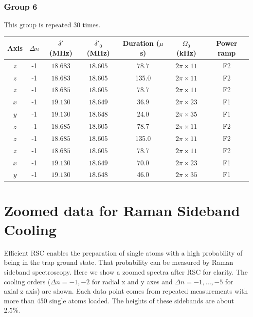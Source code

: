 \documentclass[aps,secnumarabic,amsmath,amssymb]{revtex4}
\begin{document}
\subsubsection{Group 6}
This group is repeated 30 times.
\begin{center}
  \begin{tabular}{|c|c|c|c|c|c|c|}
    \hline
    Axis&$\Delta n$&$\delta'$ (MHz)&$\delta'_0$ (MHz)&Duration ($\mu$s)& $\Omega_0$ (kHz)&Power ramp\\\hline
    $z$&-1&$18.683$&$18.605$&78.7&$2\pi\times11$&F2\\\hline
    $z$&-1&$18.683$&$18.605$&135.0&$2\pi\times11$&F2\\\hline
    $z$&-1&$18.685$&$18.605$&78.7&$2\pi\times11$&F2\\\hline
    $x$&-1&$19.130$&$18.649$&36.9&$2\pi\times23$&F1\\\hline
    $y$&-1&$19.130$&$18.648$&24.0&$2\pi\times35$&F1\\\hline
    $z$&-1&$18.685$&$18.605$&78.7&$2\pi\times11$&F2\\\hline
    $z$&-1&$18.685$&$18.605$&135.0&$2\pi\times11$&F2\\\hline
    $z$&-1&$18.685$&$18.605$&78.7&$2\pi\times11$&F2\\\hline
    $x$&-1&$19.130$&$18.649$&70.0&$2\pi\times23$&F1\\\hline
    $y$&-1&$19.130$&$18.648$&46.0&$2\pi\times35$&F1\\\hline
  \end{tabular}
\end{center}
\newpage

\section{Zoomed data for Raman Sideband Cooling}
Efficient RSC enables the preparation of single atoms with a high probability of being in the trap ground state.  That probability can be measured by Raman sideband spectroscopy.
Here we show a zoomed spectra after RSC for clarity.  The cooling orders ($\Delta n=-1,-2$ for radial x and y axes and $\Delta n=-1, \dots, -5$ for axial z axis) are shown.
Each data point comes from repeated measurements with more than 450 single atoms loaded.
The heights of these sidebands are about $2.5\%$. \\
\end{document}
